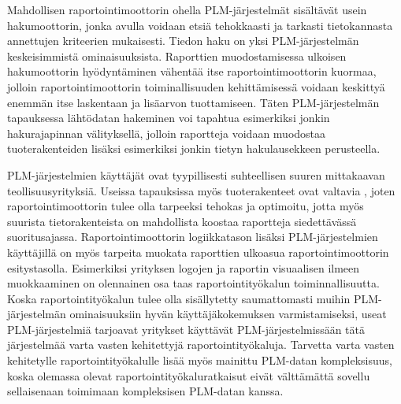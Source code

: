 Mahdollisen raportointimoottorin ohella PLM-järjestelmät sisältävät usein hakumoottorin, jonka avulla voidaan etsiä tehokkaasti ja tarkasti tietokannasta annettujen kriteerien mukaisesti. Tiedon haku on yksi PLM-järjestelmän keskeisimmistä ominaisuuksista. \cite{enriquez_approach_2019} Raporttien muodostamisessa ulkoisen hakumoottorin hyödyntäminen vähentää itse raportointimoottorin kuormaa, jolloin raportointimoottorin toiminallisuuden kehittämisessä voidaan keskittyä enemmän itse laskentaan ja lisäarvon tuottamiseen. Täten PLM-järjestelmän tapauksessa lähtödatan hakeminen voi tapahtua esimerkiksi jonkin hakurajapinnan välityksellä, jolloin raportteja voidaan muodostaa tuoterakenteiden lisäksi esimerkiksi jonkin tietyn hakulausekkeen perusteella.

PLM-järjestelmien käyttäjät ovat tyypillisesti suhteellisen suuren mittakaavan teollisuusyrityksiä. Useissa tapauksissa myös tuoterakenteet ovat valtavia \cite{rohleder_requirements_2014}, joten raportointimoottorin tulee olla tarpeeksi tehokas ja optimoitu, jotta myös suurista tietorakenteista on mahdollista koostaa raportteja siedettävässä suoritusajassa. Raportointimoottorin logiikkatason lisäksi PLM-järjestelmien käyttäjillä on myös tarpeita muokata raporttien ulkoasua raportointimoottorin esitystasolla. Esimerkiksi yrityksen logojen ja raportin visuaalisen ilmeen muokkaaminen on olennainen osa taas raportointityökalun toiminnallisuutta. Koska raportointityökalun tulee olla sisällytetty saumattomasti muihin PLM-järjestelmän ominaisuuksiin hyvän käyttäjäkokemuksen varmistamiseksi, useat PLM-järjestelmiä tarjoavat yritykset käyttävät PLM-järjestelmissään tätä järjestelmää varta vasten kehitettyjä raportointityökaluja. Tarvetta varta vasten kehitetylle raportointityökalulle lisää myös mainittu PLM-datan kompleksisuus, koska olemassa olevat raportointityökaluratkaisut eivät välttämättä sovellu sellaisenaan toimimaan kompleksisen PLM-datan kanssa.
